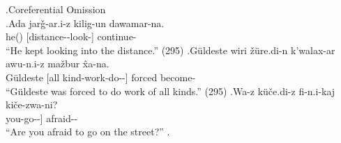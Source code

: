 \ex.\label{sent:ex8}Coreferential Omission \\
    \ag.\label{sent:ex8a}Ada jar\v{g}-ar.i-z kilig-un dawamar-na. \\
    he(\Erg[]) [distance-\Pl[]-\Dat[] look-\Masd[]] continue-\Aori[] \\
    ``He kept looking into the distance.'' (295)
    \bg.\label{sent:ex8b}G\"{u}ldeste wiri \v{z}\"{u}re.di-n k'walax-ar awu-n.i-z ma\v{z}bur \^{x}a-na. \\
    G\"{u}ldeste [all kind-\Gen[] work-\Pl[] do-\Masd[]-\Dat[]] forced become-\Aori[] \\
    ``G\"{u}ldeste was forced to do work of all kinds.'' (295)
    \cg.\label{sent:ex8c}Wa-z k\"{u}\v{c}e.di-z fi-n.i-kaj ki\v{c}e-zwa-ni? \\
    you-\Dat[] [street-\Dat[] go-\Masd[]-\Sbelc[]] afraid-\Impf[]-\Q[] \\
    ``Are you afraid to go on the street?''
    \z.

